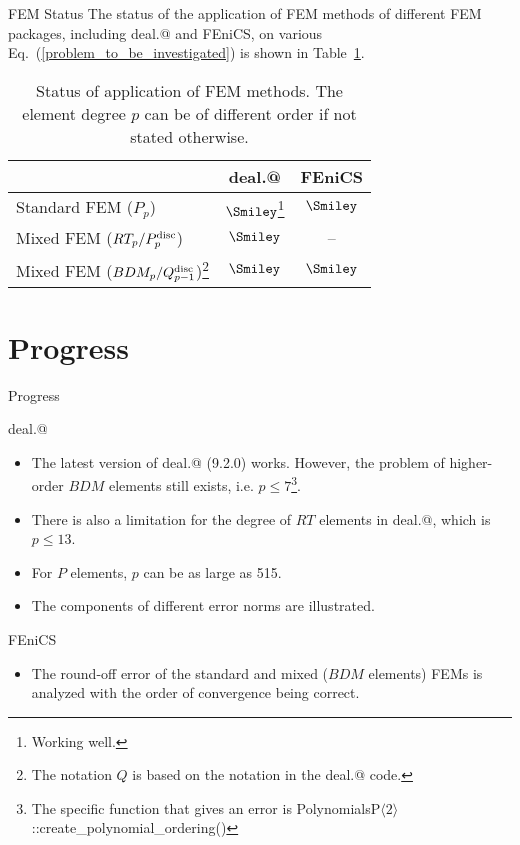 \documentclass{beamer}
\makeatletter
\newcommand*{\rom}[1]{\expandafter\@slowromancap\romannumeral #1@}
\makeatother
\begin{document}
\begin{frame}{FEM Status}
\vspace{-3em}
The status of the application of FEM methods of different FEM packages, including deal.\rom{2} and FEniCS, on various Eq.~(\ref{problem_to_be_investigated}) is shown in Table~\ref{table_status_fem_application}.
\begin{table}[!ht]
\scriptsize
\begin{tabular}{ l | c | c}
 & deal.\rom{2} & FEniCS \\ \hline
 Standard FEM ($P_p$) & $\Smiley$\footnote{Working well.} & $\Smiley$ \\ \hline
 Mixed FEM ($RT_p/P_{p}^{\rm disc}$) & $\Smiley$ & -- \\ \hline
 Mixed FEM ($BDM_p/Q_{p-1}^{\rm disc}$)\footnote{The notation $Q$ is based on the notation in the deal.\rom{2} code.} & $\Smiley$ & $\Smiley$
\end{tabular}
\caption{Status of application of FEM methods. The element degree $p$ can be of different order if not stated otherwise.}
\label{table_status_fem_application}
\end{table}
\end{frame}

\section{Progress}
\begin{frame}{Progress}
\vspace{-3.5em}
\begin{block}{deal.\rom{2}}
\begin{itemize}
 \item The latest version of deal.\rom{2} (9.2.0) works. However, the problem of higher-order $BDM$ elements still exists, i.e. $p\leq 7$\footnote{The specific function that gives an error is PolynomialsP$\langle2\rangle$::create\_polynomial\_ordering()}.
 \item There is also a limitation for the degree of $RT$ elements in deal.\rom{2}, which is $p\leq 13$.
 \item For $P$ elements, $p$ can be as large as 515.
 \item The components of different error norms are illustrated.
\end{itemize}
\end{block}
\begin{block}{FEniCS}
\begin{itemize}
 \item The round-off error of the standard and mixed ($BDM$ elements) FEMs is analyzed with the order of convergence being correct.
\end{itemize}
\end{block}
\end{frame}
\end{document}
